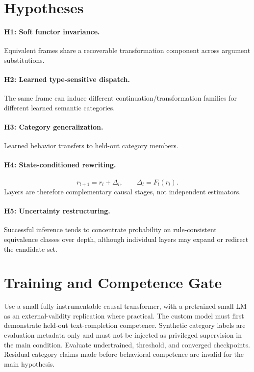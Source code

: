 \documentclass[11pt]{article}
\begin{document}
\section{Hypotheses}
\paragraph{H1: Soft functor invariance.} Equivalent frames share a recoverable transformation component across argument substitutions.
\paragraph{H2: Learned type-sensitive dispatch.} The same frame can induce different continuation/transformation families for different learned semantic categories.
\paragraph{H3: Category generalization.} Learned behavior transfers to held-out category members.
\paragraph{H4: State-conditioned rewriting.}
\[
r_{l+1}=r_l+\Delta_l,\qquad \Delta_l=F_l(r_l).
\]
Layers are therefore complementary causal stages, not independent estimators.
\paragraph{H5: Uncertainty restructuring.} Successful inference tends to concentrate probability on rule-consistent equivalence classes over depth, although individual layers may expand or redirect the candidate set.

\section{Training and Competence Gate}
Use a small fully instrumentable causal transformer, with a pretrained small LM as an external-validity replication where practical. The custom model must first demonstrate held-out text-completion competence. Synthetic category labels are evaluation metadata only and must not be injected as privileged supervision in the main condition. Evaluate undertrained, threshold, and converged checkpoints. Residual category claims made before behavioral competence are invalid for the main hypothesis.
\end{document}
